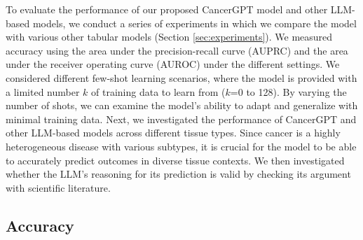 To evaluate the performance of our proposed CancerGPT model and other LLM-based models, we conduct a series of experiments in which we compare the model with various other tabular models (Section \ref{sec:experiments}). We measured accuracy using the area under the precision-recall curve (AUPRC) and the area under the receiver operating curve (AUROC) under the different settings. We considered different few-shot learning scenarios, where the model is provided with a limited number $k$ of training data to learn from ($k$=0 to 128). By varying the number of shots, we can examine the model's ability to adapt and generalize with minimal training data. 
Next, we investigated the performance of CancerGPT and other LLM-based models across different tissue types. Since cancer is a highly heterogeneous disease with various subtypes, it is crucial for the model to be able to accurately predict outcomes in diverse tissue contexts. We then investigated whether the LLM's reasoning for its prediction is valid by checking its argument with scientific literature. 

\subsection{Accuracy}

